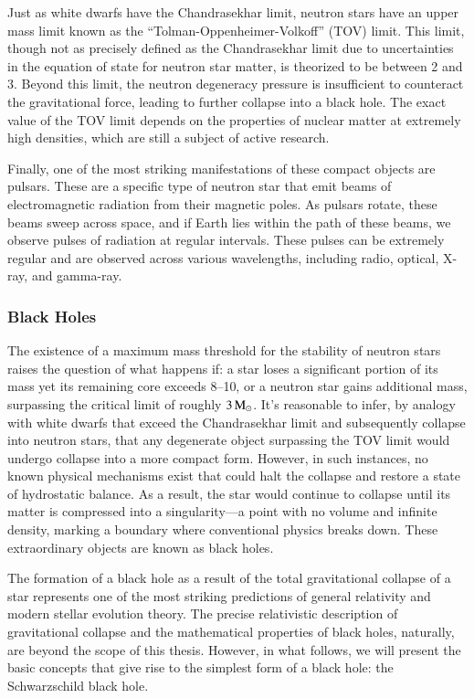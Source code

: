 \documentclass[main.tex]{subfiles}
\begin{document}
    Just as white dwarfs have the Chandrasekhar limit, neutron stars have an upper mass limit known as the ``Tolman-Oppenheimer-Volkoff'' (TOV) limit. This limit, though not as precisely defined as the Chandrasekhar limit due to uncertainties in the equation of state for neutron star matter, is theorized to be between 2 and 3\msun. Beyond this limit, the neutron degeneracy pressure is insufficient to counteract the gravitational force, leading to further collapse into a black hole. The exact value of the TOV limit depends on the properties of nuclear matter at extremely high densities, which are still a subject of active research.

    Finally, one of the most striking manifestations of these compact objects are pulsars. These are a specific type of neutron star that emit beams of electromagnetic radiation from their magnetic poles. As pulsars rotate, these beams sweep across space, and if Earth lies within the path of these beams, we observe pulses of radiation at regular intervals. These pulses can be extremely regular and are observed across various wavelengths, including radio, optical, X-ray, and gamma-ray.

    \subsubsection{Black Holes}
    \resetinlineenum
    The existence of a maximum mass threshold for the stability of neutron stars raises the question of what happens if: \inlineitem a star loses a significant portion of its mass yet its remaining core exceeds \numrange{8}{10}\msun, or \inlineitem a neutron star gains additional mass, surpassing the critical limit of roughly $3\mathrm{\,M_\odot}$.  It's reasonable to infer, by analogy with white dwarfs that exceed the Chandrasekhar limit and subsequently collapse into neutron stars, that any degenerate object surpassing the TOV limit would undergo collapse into a more compact form. However, in such instances, no known physical mechanisms exist that could halt the collapse and restore a state of hydrostatic balance. As a result, the star would continue to collapse until its matter is compressed into a singularity---a point with no volume and infinite density, marking a boundary where conventional physics breaks down. These extraordinary objects are known as black holes.

    The formation of a black hole as a result of the total gravitational collapse of a star represents one of the most striking predictions of general relativity and modern stellar evolution theory. The precise relativistic description of gravitational collapse and the mathematical properties of black holes, naturally, are beyond the scope of this thesis. However, in what follows, we will present the basic concepts that give rise to the simplest form of a black hole: the Schwarzschild black hole.
\end{document}
